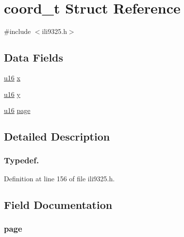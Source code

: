 \hypertarget{structcoord__t}{\section{coord\-\_\-t Struct Reference}
\label{structcoord__t}
}


{\ttfamily \#include $<$ili9325.\-h$>$}

\subsection*{Data Fields}
\begin{DoxyCompactItemize}
\item 
\hyperlink{p8_2pinguino_2core_2typedef_8h_a50b0d1c7a54fa09a64a3ac111c778520}{u16} \hyperlink{structcoord__t_ae2825f524c71a19eab26e76a693473fa}{x}
\item 
\hyperlink{p8_2pinguino_2core_2typedef_8h_a50b0d1c7a54fa09a64a3ac111c778520}{u16} \hyperlink{structcoord__t_aae823bf8305b29bd7ace3d02c1ffe687}{y}
\item 
\hyperlink{p8_2pinguino_2core_2typedef_8h_a50b0d1c7a54fa09a64a3ac111c778520}{u16} \hyperlink{structcoord__t_a1c6ec8b0c6ff09c8ad3bbd768775b7bd}{page}
\end{DoxyCompactItemize}


\subsection{Detailed Description}


 \subsubsection*{Typedef. }

Definition at line 156 of file ili9325.\-h.



\subsection{Field Documentation}
\hypertarget{structcoord__t_a1c6ec8b0c6ff09c8ad3bbd768775b7bd}{
\subsubsection[{page}]{ page}}\label{structcoord__t_a1c6ec8b0c6ff09c8ad3bbd768775b7bd}


